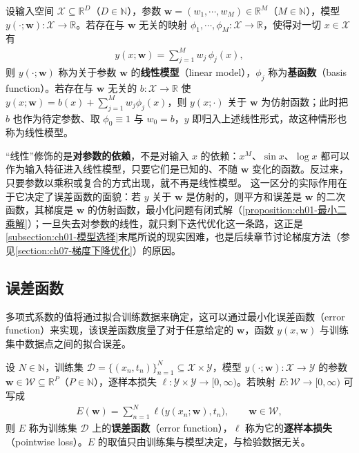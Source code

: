 \documentclass[../../main.tex]{subfiles}
\begin{document}
\begin{definition}[线性模型]\label{definition:ch01-线性模型}
设输入空间 $\mathcal{X}\subseteq\mathbb{R}^{D}$（$D\in\mathbb{N}$），参数 $\mathbf{w}=(w_1,\cdots,w_{M})\in\mathbb{R}^{M}$（$M\in\mathbb{N}$），模型 $y(\cdot;\mathbf{w}):\mathcal{X}\to\mathbb{R}$。若存在与 $\mathbf{w}$ 无关的映射 $\phi_1,\cdots,\phi_{M}:\mathcal{X}\to\mathbb{R}$，使得对一切 $x\in\mathcal{X}$ 有
\begin{align*}
  y(x;\mathbf{w})=\sum_{j=1}^{M}w_j\,\phi_j(x),
\end{align*}
则 $y(\cdot;\mathbf{w})$ 称为关于参数 $\mathbf{w}$ 的\textbf{线性模型}（linear model），$\phi_j$ 称为\textbf{基函数}（basis function）。若存在与 $\mathbf{w}$ 无关的 $b:\mathcal{X}\to\mathbb{R}$ 使 $y(x;\mathbf{w})=b(x)+\sum_{j=1}^{M}w_j\phi_j(x)$，则 $y(x;\cdot)$ 关于 $\mathbf{w}$ 为仿射函数；此时把 $b$ 也作为待定参数、取 $\phi_0\equiv1$ 与 $w_0=b$，$y$ 即归入上述线性形式，故这种情形也称为线性模型。
\end{definition}

\begin{remark}
“线性”修饰的是\textbf{对参数的依赖}，不是对输入 $x$ 的依赖：$x^M$、$\sin x$、$\log x$ 都可以作为输入特征进入线性模型，只要它们是已知的、不随 $\mathbf{w}$ 变化的函数。反过来，只要参数以乘积或复合的方式出现，就不再是线性模型。
这一区分的实际作用在于它决定了误差函数的面貌：若 $y$ 关于 $\mathbf{w}$ 是仿射的，则平方和误差是 $\mathbf{w}$ 的二次函数，其梯度是 $\mathbf{w}$ 的仿射函数，最小化问题有闭式解（\cref{proposition:ch01-最小二乘解}）；一旦失去对参数的线性，就只剩下迭代优化这一条路，这正是\cref{subsection:ch01-模型选择}末尾所说的现实困难，也是后续章节讨论梯度方法（参见\cref{section:ch07-梯度下降优化}）的原因。
\end{remark}

\subsection{误差函数}\label{subsection:ch01-误差函数}

多项式系数的值将通过拟合训练数据来确定，这可以通过最小化误差函数（error function）来实现，该误差函数度量了对于任意给定的 $\mathbf{w}$，函数 $y(x,\mathbf{w})$ 与训练集中数据点之间的拟合误差。

\begin{definition}[误差函数]\label{definition:ch01-误差函数}
设 $N\in\mathbb{N}$，训练集 $\mathcal{D}=\{(x_n,t_n)\}_{n=1}^{N}\subseteq\mathcal{X}\times\mathcal{Y}$，模型 $y(\cdot;\mathbf{w}):\mathcal{X}\to\mathcal{Y}$ 的参数 $\mathbf{w}\in\mathcal{W}\subseteq\mathbb{R}^{P}$（$P\in\mathbb{N}$），逐样本损失 $\ell:\mathcal{Y}\times\mathcal{Y}\to[0,\infty)$。若映射 $E:\mathcal{W}\to[0,\infty)$ 可写成
\begin{align*}
  E(\mathbf{w})=\sum_{n=1}^{N}\ell\bigl(y(x_n;\mathbf{w}),t_n\bigr),\qquad \mathbf{w}\in\mathcal{W},
\end{align*}
则 $E$ 称为训练集 $\mathcal{D}$ 上的\textbf{误差函数}（error function），$\ell$ 称为它的\textbf{逐样本损失}（pointwise loss）。$E$ 的取值只由训练集与模型决定，与检验数据无关。
\end{definition}
\end{document}
